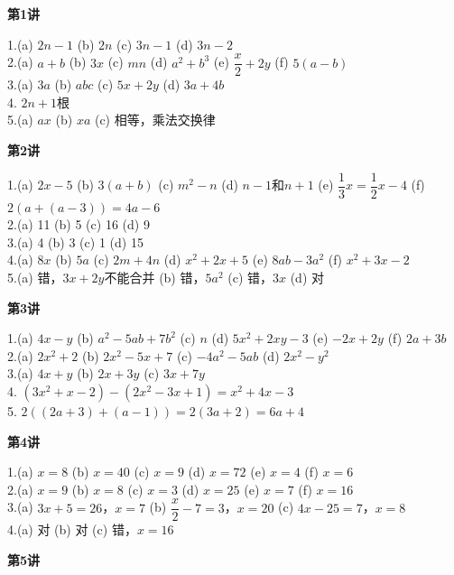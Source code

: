 

\textbf{第1讲}

1.(a) $2n-1$ \quad (b) $2n$ \quad (c) $3n-1$ \quad (d) $3n-2$\\
2.(a) $a+b$ \quad (b) $3x$ \quad (c) $mn$ \quad (d) $a^2+b^3$ \quad (e) $\dfrac{x}{2}+2y$ \quad (f) $5(a-b)$\\
3.(a) $3a$ \quad (b) $abc$ \quad (c) $5x+2y$ \quad (d) $3a+4b$\\
4. $2n+1$根\\
5.(a) $ax$ \quad (b) $xa$ \quad (c) 相等，乘法交换律

\textbf{第2讲}

1.(a) $2x-5$ \quad (b) $3(a+b)$ \quad (c) $m^2-n$ \quad (d) $n-1$和$n+1$ \quad (e) $\dfrac13x=\dfrac12x-4$ \quad (f) $2(a+(a-3))=4a-6$\\
2.(a) 11 \quad (b) 5 \quad (c) 16 \quad (d) 9\\
3.(a) 4 \quad (b) 3 \quad (c) 1 \quad (d) 15\\
4.(a) $8x$ \quad (b) $5a$ \quad (c) $2m+4n$ \quad (d) $x^2+2x+5$ \quad (e) $8ab-3a^2$ \quad (f) $x^2+3x-2$\\
5.(a) 错，$3x+2y$不能合并 \quad (b) 错，$5a^2$ \quad (c) 错，$3x$ \quad (d) 对

\textbf{第3讲}

1.(a) $4x-y$ \quad (b) $a^2-5ab+7b^2$ \quad (c) $n$ \quad (d) $5x^2+2xy-3$ \quad (e) $-2x+2y$ \quad (f) $2a+3b$\\
2.(a) $2x^2+2$ \quad (b) $2x^2-5x+7$ \quad (c) $-4a^2-5ab$ \quad (d) $2x^2-y^2$\\
3.(a) $4x+y$ \quad (b) $2x+3y$ \quad (c) $3x+7y$\\
4. $(3x^2+x-2)-(2x^2-3x+1)=x^2+4x-3$\\
5. $2((2a+3)+(a-1))=2(3a+2)=6a+4$


\textbf{第4讲}

1.(a) $x=8$ \quad (b) $x=40$ \quad (c) $x=9$ \quad (d) $x=72$ \quad (e) $x=4$ \quad (f) $x=6$\\
2.(a) $x=9$ \quad (b) $x=8$ \quad (c) $x=3$ \quad (d) $x=25$ \quad (e) $x=7$ \quad (f) $x=16$\\
3.(a) $3x+5=26$，$x=7$ \quad (b) $\dfrac{x}{2}-7=3$，$x=20$ \quad (c) $4x-25=7$，$x=8$\\
4.(a) 对 \quad (b) 对 \quad (c) 错，$x=16$

\textbf{第5讲}

